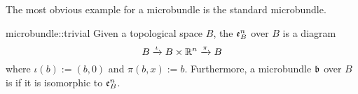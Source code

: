 \begin{myparagraph}
    The most obvious example for a microbundle is the standard microbundle.
\end{myparagraph}

\begin{myexample}{microbundle::trivial}
    Given a topological space $B$, the  $\mathfrak{e}^{n}_{B}$ over $B$ is a diagram
    \[ B \xrightarrow{\iota} B \times \mathbb{R}^n \xrightarrow{\pi} B{} \]
    where $\iota(b) := (b, 0)$ and $\pi(b, x) := b$.
    Furthermore, a microbundle $\mathfrak{b}$ over $B$ is  if it is isomorphic to $\mathfrak{e}^{n}_{B}$.
\end{myexample}